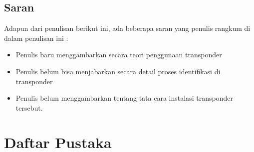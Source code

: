 \documentclass[9pt,twocolumn,twoside]{Gunadarma}
\begin{document}
\subsection{Saran}
Adapun dari penulisan berikut ini, ada beberapa saran yang penulis rangkum di dalam penulisan ini :
\begin{itemize}
\item Penulis baru menggambarkan secara teori penggunaan transponder 
\item Penulis belum bisa menjabarkan secara detail proses identifikasi di transponder
\item Penulis belum menggambarkan tentang tata cara instalasi transponder tersebut. 
\end{itemize}

\section{Daftar Pustaka}




%

\end{document}
